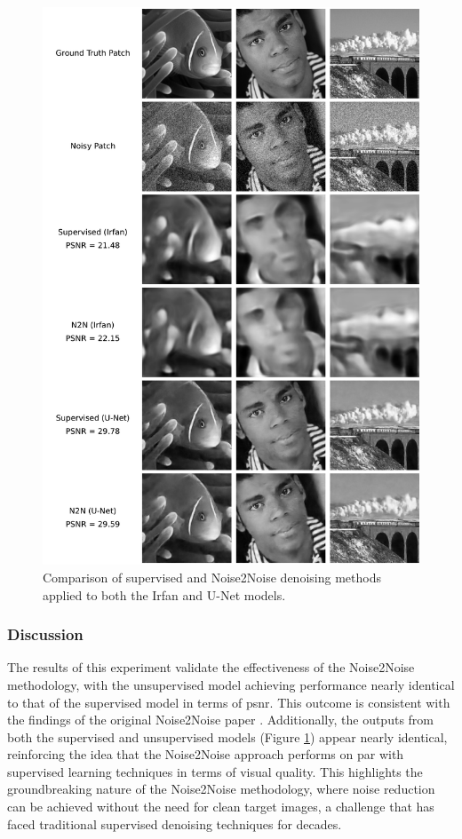 \begin{figure}[p]
    \centering
    \includegraphics[width=\textwidth]{img/ch6/n2n_imagenet/denoising_comparison_2.pdf}
    \caption{Comparison of supervised and Noise2Noise denoising methods applied to both the Irfan and U-Net models.}
    \label{fig:n2n-vs-supervised}
\end{figure}

\subsubsection{Discussion}

The results of this experiment validate the effectiveness of the Noise2Noise methodology, with the unsupervised model achieving performance nearly identical to that of the supervised model in terms of \acrshort{psnr}. This outcome is consistent with the findings of the original Noise2Noise paper \cite{lehtinen_noise2noise_2018}. Additionally, the outputs from both the supervised and unsupervised models (Figure \ref{fig:n2n-vs-supervised}) appear nearly identical, reinforcing the idea that the Noise2Noise approach performs on par with supervised learning techniques in terms of visual quality. This highlights the groundbreaking nature of the Noise2Noise methodology, where noise reduction can be achieved without the need for clean target images, a challenge that has faced traditional supervised denoising techniques for decades.

